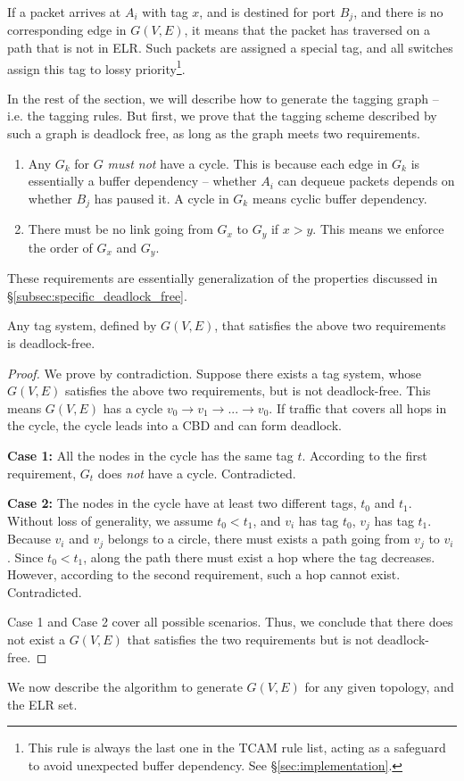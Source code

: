 If a packet arrives at $A_i$ with tag $x$, and is destined for port $B_j$, and
there is no corresponding edge in $G(V,E)$, it means that the packet has
traversed on a path that is not in ELR.  Such packets are assigned a special
tag, and all switches assign this tag to lossy priority\footnote{This rule is
always the last one in the TCAM rule list, acting as a safeguard to avoid
unexpected buffer dependency.  See \S\ref{sec:implementation}.}.

In the rest of the section, we will describe how to generate the tagging graph
-- i.e. the tagging rules. But first, we prove that the tagging scheme described
by such a graph is deadlock free, as long as the graph meets two requirements.

\begin{enumerate}

		\item  Any $G_k$ for $G$ {\em must not} have a cycle.  This is
				because each edge in $G_k$ is essentially a buffer dependency --
				whether $A_i$ can dequeue packets depends on whether $B_j$ has
				paused it. A cycle in $G_k$ means cyclic buffer
				dependency.
		\item There must be no link going from
				$G_x$ to $G_y$ if $x>y$.  This means we enforce the order of
				$G_x$ and $G_y$.
\end{enumerate}
These requirements are essentially generalization of the properties
discussed in \S\ref{subsec:specific_deadlock_free}.
\begin{theorem}
Any tag system, defined by $G(V,E)$, that satisfies the above two requirements is deadlock-free.
\end{theorem}

\begin{proof}
We prove by contradiction. Suppose there exists a tag system,
whose $G(V,E)$ satisfies the above two requirements, but is not deadlock-free. This means
$G(V,E)$ has a cycle $v_0 \rightarrow v_1 \rightarrow ... \rightarrow v_0$. If
traffic that covers all hops in the cycle, the cycle leads into a CBD and can form deadlock.

\textbf{Case 1:} All the nodes in the cycle has the same tag $t$. According to
the first requirement, $G_t$ does {\em not} have a cycle. Contradicted.

\textbf{Case 2:} The nodes in the cycle have at least two different tags, $t_0$ and $t_1$.
Without loss of generality, we assume $t_0 < t_1$, and $v_i$ has tag $t_0$, $v_j$
has tag $t_1$. Because $v_i$ and $v_j$ belongs to a circle, there must exists
a path going from $v_j$ to $v_i$. Since $t_0 < t_1$, along the path there must exist
a hop where the tag decreases. However, according to the second requirement, such a hop
cannot exist. Contradicted.

Case 1 and Case 2 cover all possible scenarios. Thus, we conclude that there does not
exist a $G(V,E)$ that satisfies the two requirements but is not deadlock-free.
\end{proof}
We now describe the algorithm to generate $G(V,E)$ for any given topology, and
the ELR set.

